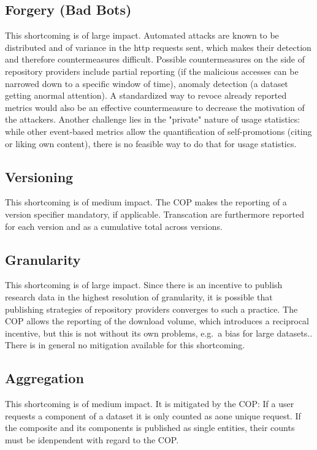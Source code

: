 \documentclass[conference, a4paper]{IEEEtran}\usepackage[]{graphicx}\usepackage[]{color}
\begin{document}
\subsection{Forgery (Bad Bots)}

This shortcoming is of large impact.
Automated attacks are known to be distributed and of variance in the http requests sent,
which makes their detection and therefore countermeasures difficult.
Possible countermeasures on the side of repository providers include partial reporting
(if the malicious accesses can be narrowed down to a specific window of time),
anomaly detection (a dataset getting anormal attention).
A standardized way to revoce already reported metrics
would also be an effective countermeasure to decrease
the motivation of the attackers.
Another challenge lies in the "private" nature of usage statistics:
while other event-based metrics allow the quantification of self-promotions (citing
or liking own content), there is no feasible way to do that for usage statistics.

\subsection{Versioning}
This shortcoming is of medium impact.
The COP makes the reporting of a version specifier mandatory, if applicable.
Transcation are furthermore reported for each version
and as a cumulative total across versions.

\subsection{Granularity}
This shortcoming is of large impact.
Since there is an incentive to publish research data in the highest resolution of granularity,
it is possible that publishing strategies of repository providers converges
to such a practice.
The COP allows the reporting of the download volume, which introduces a reciprocal incentive,
but this is not without its own problems, e.g.\ a bias for large datasets..
There is in general no mitigation available for this shortcoming.

\subsection{Aggregation}
This shortcoming is of medium impact.
It is mitigated by the COP: If a user requests a component of a dataset
it is only counted as aone unique request.
If the composite and its components is published as single entities,
their counts must be idenpendent with regard to the COP.
\end{document}
